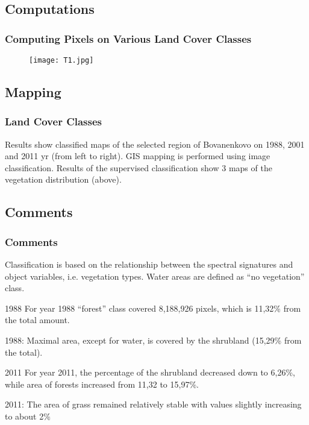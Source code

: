 \documentclass[pdflatex,compress,8pt,
	xcolor={dvipsnames,dvipsnames,svgnames,x11names,table},
	hyperref={colorlinks = true,
	breaklinks = true, 
	urlcolor = NavyBlue, 
	breaklinks = true}]{beamer}
\begin{document}
\subsection{Computations}
\begin{frame}\frametitle{Computing Pixels on Various Land Cover Classes}
\begin{figure}[H]
	\centering
		\texttt{[image: T1.jpg]}
\end{figure}
\end{frame}

\subsection{Mapping}
\begin{frame}\frametitle{Land Cover Classes}
\begin{figure}[H]
	\centering
\end{figure}
Results show classified maps of the selected region of Bovanenkovo on 1988, 2001 and 2011 yr (from left to right).
GIS mapping is performed using image classification. Results of the supervised classification show 3 maps of the vegetation distribution (above). 
\end{frame}

\subsection{Comments}
\begin{frame}\frametitle{Comments}
Classification is based on the relationship between the spectral signatures and object variables, i.e. vegetation types. Water areas are defined as “no vegetation” class.

\begin{block}{1988}
For year 1988 “forest” class covered 8,188,926 pixels, which is 11,32\% from the total amount.
\end{block}

\begin{examples}{1988:}
Maximal area, except for water, is covered by the shrubland (15,29\% from the total).
\end{examples}

\begin{block}{2011}
For year 2011, the percentage of the shrubland decreased down to 6,26\%, while area of forests increased from 11,32 to 15,97\%.
\end{block}

\begin{examples}{2011:}
The area of grass remained relatively stable with values slightly increasing to about 2\%
\end{examples}

\end{frame}
\end{document}
